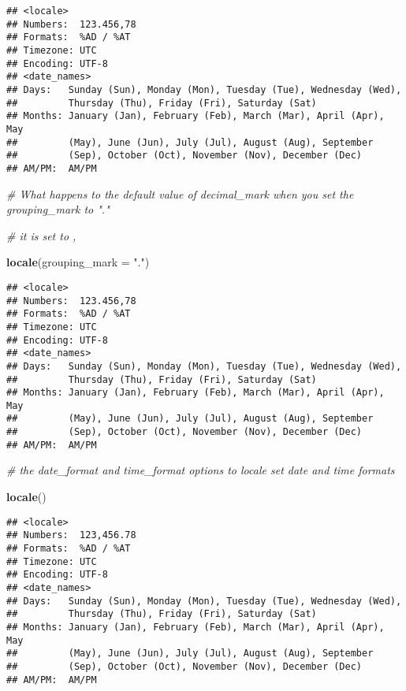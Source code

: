 \documentclass[]{article}
\newenvironment{Shaded}{\begin{snugshade}}{\end{snugshade}}
\newcommand{\KeywordTok}[1]{\textcolor[rgb]{0.13,0.29,0.53}{\textbf{#1}}}
\newcommand{\DataTypeTok}[1]{\textcolor[rgb]{0.13,0.29,0.53}{#1}}
\newcommand{\StringTok}[1]{\textcolor[rgb]{0.31,0.60,0.02}{#1}}
\newcommand{\CommentTok}[1]{\textcolor[rgb]{0.56,0.35,0.01}{\textit{#1}}}
\newcommand{\NormalTok}[1]{#1}
\begin{document}
\begin{verbatim}
## <locale>
## Numbers:  123.456,78
## Formats:  %AD / %AT
## Timezone: UTC
## Encoding: UTF-8
## <date_names>
## Days:   Sunday (Sun), Monday (Mon), Tuesday (Tue), Wednesday (Wed),
##         Thursday (Thu), Friday (Fri), Saturday (Sat)
## Months: January (Jan), February (Feb), March (Mar), April (Apr), May
##         (May), June (Jun), July (Jul), August (Aug), September
##         (Sep), October (Oct), November (Nov), December (Dec)
## AM/PM:  AM/PM
\end{verbatim}

\begin{Shaded}
\begin{Highlighting}[]
\CommentTok{# What happens to the default value of decimal_mark when you set the grouping_mark to "."}

\CommentTok{# it is set to , }

\KeywordTok{locale}\NormalTok{(}\DataTypeTok{grouping_mark =} \StringTok{"."}\NormalTok{)}
\end{Highlighting}
\end{Shaded}

\begin{verbatim}
## <locale>
## Numbers:  123.456,78
## Formats:  %AD / %AT
## Timezone: UTC
## Encoding: UTF-8
## <date_names>
## Days:   Sunday (Sun), Monday (Mon), Tuesday (Tue), Wednesday (Wed),
##         Thursday (Thu), Friday (Fri), Saturday (Sat)
## Months: January (Jan), February (Feb), March (Mar), April (Apr), May
##         (May), June (Jun), July (Jul), August (Aug), September
##         (Sep), October (Oct), November (Nov), December (Dec)
## AM/PM:  AM/PM
\end{verbatim}

\begin{Shaded}
\begin{Highlighting}[]
\CommentTok{# the date_format and time_format options to locale set date and time formats}

\KeywordTok{locale}\NormalTok{()}
\end{Highlighting}
\end{Shaded}

\begin{verbatim}
## <locale>
## Numbers:  123,456.78
## Formats:  %AD / %AT
## Timezone: UTC
## Encoding: UTF-8
## <date_names>
## Days:   Sunday (Sun), Monday (Mon), Tuesday (Tue), Wednesday (Wed),
##         Thursday (Thu), Friday (Fri), Saturday (Sat)
## Months: January (Jan), February (Feb), March (Mar), April (Apr), May
##         (May), June (Jun), July (Jul), August (Aug), September
##         (Sep), October (Oct), November (Nov), December (Dec)
## AM/PM:  AM/PM
\end{verbatim}
\end{document}
